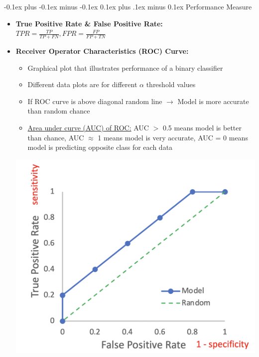 \documentclass[landscape]{article}
\makeatletter
\renewcommand{\subsection}{\@startsection{subsection}{2}{0mm}%
  {-0.1ex plus -0.1ex minus -0.1ex}%
  {0.1ex plus .1ex minus 0.1ex}%
{\normalfont\scriptsize\bfseries}}
\makeatother
\begin{document}
\begin{multicols*}{5}
        \subsection{Performance Measure}
        \begin{itemize}
          \item \textbf{True Positive Rate \& False Positive Rate:} $TPR = \frac{TP}{TP+FN}, FPR = \frac{FP}{FP+TN}$
          \item \textbf{Receiver Operator Characteristics (ROC) Curve:}
          \begin{itemize}
            \item Graphical plot that illustrates performance of a binary classifier
            \item Different data plots are for different $\alpha$ threshold values
            \item If ROC curve is above diagonal random line $\rightarrow$ Model is more accurate than random chance
            \item \underline{Area under curve (AUC) of ROC:} AUC $>$ 0.5 means model is better than chance, AUC $\approx$ 1 means model is very accurate, AUC = 0 means model is predicting opposite class for each data
          \end{itemize}
          \includegraphics[width=0.55\linewidth]{19_ROC.png}
        \end{itemize}


\end{multicols*}
\end{document}

